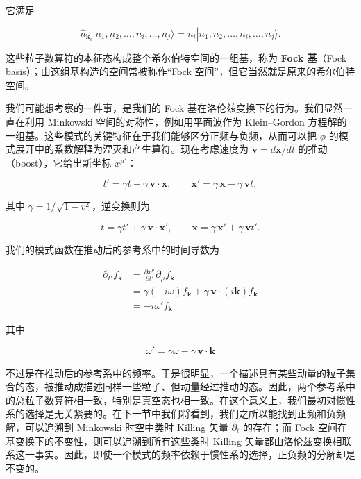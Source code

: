 它满足

\begin{equation*}
\hat{n}_{\mathbf{k}_i}|n_1, n_2, \ldots, n_i, \ldots, n_j\rangle = n_i|n_1, n_2, \ldots, n_i, \ldots, n_j\rangle.
\tag{9.73}
\end{equation*}

这些粒子数算符的本征态构成整个希尔伯特空间的一组基，称为 \textbf{Fock 基}（Fock basis）；由这组基构造的空间常被称作“Fock 空间”，但它当然就是原来的希尔伯特空间。

我们可能想考察的一件事，是我们的 Fock 基在洛伦兹变换下的行为。我们显然一直在利用 Minkowski 空间的对称性，例如用平面波作为 Klein--Gordon 方程解的一组基。这些模式的关键特征在于我们能够区分正频与负频，从而可以把 $\phi$ 的模式展开中的系数解释为湮灭和产生算符。现在考虑速度为 $\mathbf{v} = d\mathbf{x}/dt$ 的推动（boost），它给出新坐标 $x^{\mu'}$：

\begin{equation*}
t' = \gamma t - \gamma\,\mathbf{v}\cdot\mathbf{x}, \qquad \mathbf{x}' = \gamma\,\mathbf{x} - \gamma\,\mathbf{v}t,
\tag{9.74}
\end{equation*}

其中 $\gamma = 1/\sqrt{1-v^2}$，逆变换则为

\begin{equation*}
t = \gamma t' + \gamma\,\mathbf{v}\cdot\mathbf{x}', \qquad \mathbf{x} = \gamma\,\mathbf{x}' + \gamma\,\mathbf{v}t'.
\tag{9.75}
\end{equation*}

我们的模式函数在推动后的参考系中的时间导数为

\begin{align*}
\partial_{t'}f_{\mathbf{k}} &= \frac{\partial x^{\mu}}{\partial t'}\partial_{\mu}f_{\mathbf{k}} \\
&= \gamma(-i\omega)f_{\mathbf{k}} + \gamma\,\mathbf{v}\cdot(i\mathbf{k})f_{\mathbf{k}} \\
&= -i\omega' f_{\mathbf{k}}
\tag{9.76}
\end{align*}

其中

\begin{equation*}
\omega' = \gamma\omega - \gamma\,\mathbf{v}\cdot\mathbf{k}
\tag{9.77}
\end{equation*}

不过是在推动后的参考系中的频率。于是很明显，一个描述具有某些动量的粒子集合的态，被推动成描述同样一些粒子、但动量经过推动的态。因此，两个参考系中的总粒子数算符相一致，特别是真空态也相一致。在这个意义上，我们最初对惯性系的选择是无关紧要的。在下一节中我们将看到，我们之所以能找到正频和负频解，可以追溯到 Minkowski 时空中类时 Killing 矢量 $\partial_t$ 的存在；而 Fock 空间在基变换下的不变性，则可以追溯到所有这些类时 Killing 矢量都由洛伦兹变换相联系这一事实。因此，即使一个模式的频率依赖于惯性系的选择，正负频的分解却是不变的。

